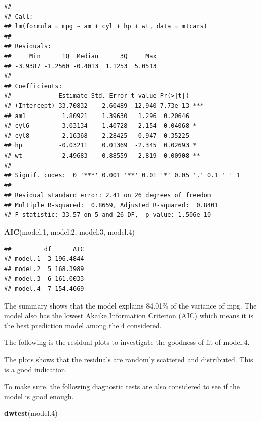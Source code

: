\documentclass[]{article}
\newenvironment{Shaded}{\begin{snugshade}}{\end{snugshade}}
\newcommand{\KeywordTok}[1]{\textcolor[rgb]{0.13,0.29,0.53}{\textbf{#1}}}
\newcommand{\DecValTok}[1]{\textcolor[rgb]{0.00,0.00,0.81}{#1}}
\newcommand{\NormalTok}[1]{#1}
\begin{document}
\begin{verbatim}
## 
## Call:
## lm(formula = mpg ~ am + cyl + hp + wt, data = mtcars)
## 
## Residuals:
##     Min      1Q  Median      3Q     Max 
## -3.9387 -1.2560 -0.4013  1.1253  5.0513 
## 
## Coefficients:
##             Estimate Std. Error t value Pr(>|t|)    
## (Intercept) 33.70832    2.60489  12.940 7.73e-13 ***
## am1          1.80921    1.39630   1.296  0.20646    
## cyl6        -3.03134    1.40728  -2.154  0.04068 *  
## cyl8        -2.16368    2.28425  -0.947  0.35225    
## hp          -0.03211    0.01369  -2.345  0.02693 *  
## wt          -2.49683    0.88559  -2.819  0.00908 ** 
## ---
## Signif. codes:  0 '***' 0.001 '**' 0.01 '*' 0.05 '.' 0.1 ' ' 1
## 
## Residual standard error: 2.41 on 26 degrees of freedom
## Multiple R-squared:  0.8659, Adjusted R-squared:  0.8401 
## F-statistic: 33.57 on 5 and 26 DF,  p-value: 1.506e-10
\end{verbatim}

\begin{Shaded}
\begin{Highlighting}[]
\KeywordTok{AIC}\NormalTok{(model.}\DecValTok{1}\NormalTok{, model.}\DecValTok{2}\NormalTok{, model.}\DecValTok{3}\NormalTok{, model.}\DecValTok{4}\NormalTok{)}
\end{Highlighting}
\end{Shaded}

\begin{verbatim}
##         df      AIC
## model.1  3 196.4844
## model.2  5 168.3989
## model.3  6 161.0033
## model.4  7 154.4669
\end{verbatim}

The summary shows that the model explains 84.01\% of the variance of
mpg. The model also has the lowest Akaike Information Criterion (AIC)
which means it is the best prediction model among the 4 considered.

The following is the residual plots to investigate the goodness of fit
of model.4.

The plots shows that the residuals are randomly scattered and
distributed. This is a good indication.

To make sure, the following diagnostic tests are also considered to see
if the model is good enough.

\begin{Shaded}
\begin{Highlighting}[]
\KeywordTok{dwtest}\NormalTok{(model.}\DecValTok{4}\NormalTok{)}
\end{Highlighting}
\end{Shaded}
\end{document}
